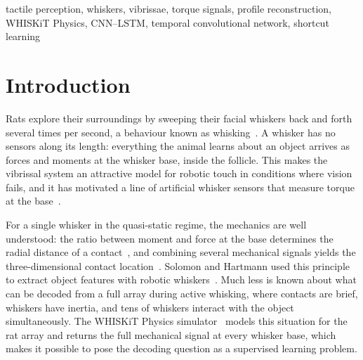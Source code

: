 \documentclass[conference]{IEEEtran}
\begin{document}
\begin{IEEEkeywords}
tactile perception, whiskers, vibrissae, torque signals, profile reconstruction, WHISKiT Physics, CNN--LSTM, temporal convolutional network, shortcut learning
\end{IEEEkeywords}

\section{Introduction}
Rats explore their surroundings by sweeping their facial whiskers back and forth several times per second, a behaviour known as whisking~\cite{mitchinson2011}. A whisker has no sensors along its length: everything the animal learns about an object arrives as forces and moments at the whisker base, inside the follicle. This makes the vibrissal system an attractive model for robotic touch in conditions where vision fails, and it has motivated a line of artificial whisker sensors that measure torque at the base~\cite{kaneko1998,solomon2006,pearson2011,lepora2018}.

For a single whisker in the quasi-static regime, the mechanics are well understood: the ratio between moment and force at the base determines the radial distance of a contact~\cite{kaneko1998,birdwell2007}, and combining several mechanical signals yields the three-dimensional contact location~\cite{huet2017}. Solomon and Hartmann used this principle to extract object features with robotic whiskers~\cite{solomon2006}. Much less is known about what can be decoded from a full array during active whisking, where contacts are brief, whiskers have inertia, and tens of whiskers interact with the object simultaneously. The WHISKiT Physics simulator~\cite{zweifel2021} models this situation for the rat array and returns the full mechanical signal at every whisker base, which makes it possible to pose the decoding question as a supervised learning problem.
\end{document}
